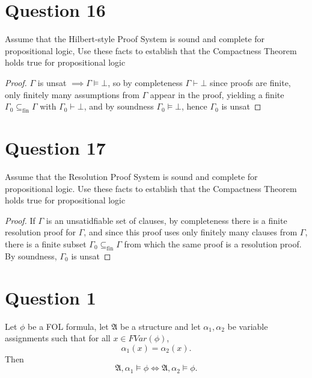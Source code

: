 \documentclass{article}
\newtheorem{lemma}[theorem]{Lemma}
\let\oldlemma\lemma
\let\endoldlemma\endlemma
\renewenvironment{lemma}
  {\begin{tcolorbox}[
      colback=green!8,
      colframe=green!50!black,
      boxrule=0.6pt,
      arc=2pt,
      left=6pt,right=6pt,top=4pt,bottom=4pt
    ]\oldlemma}
  {\endoldlemma\end{tcolorbox}}
\begin{document}
\section*{Question 16}
Assume that the Hilbert-style Proof System is sound and complete for propositional logic, Use these facts to establish that the Compactness Theorem holds true for propositional logic
\begin{proof}
    $\Gamma$ is unsat $\implies\Gamma \models \bot$, so by completeness $\Gamma \vdash \bot$ since proofs are finite, only finitely many assumptions from $\Gamma$ appear in the proof, yielding a finite $\Gamma_0 \subseteq_{\mathrm{fin}} \Gamma$ with $\Gamma_0 \vdash \bot$, 
    and by soundness $\Gamma_0 \models \bot$, hence $\Gamma_0$ is unsat
    \end{proof}
\section*{Question 17}
Assume that the Resolution Proof System is sound and complete for propositional logic. Use these facts to establish that the Compactness Theorem holds true for propositional logic
\begin{proof}
    If $\Gamma$ is an unsatidfiable set of clauses, by completeness there is a finite resolution proof for $\Gamma$, and since this proof uses only finitely many clauses from $\Gamma$, there is a finite subset $\Gamma_0 \subseteq_{\mathrm{fin}} \Gamma$ from which the same proof is a resolution proof. 
    By soundness, $\Gamma_0$ is unsat
    \end{proof}

\newpage

\section*{Question 1}

\begin{lemma}[Relevance Lemma for FOL]
Let $\phi$ be a FOL formula, let $\mathfrak{A}$ be a structure and let $\alpha_1,\alpha_2$ be
variable assignments such that for all $x \in FVar(\phi)$,
\[
\alpha_1(x) = \alpha_2(x).
\]
Then
\[
\mathfrak{A},\alpha_1 \models \phi \iff \mathfrak{A},\alpha_2 \models \phi.
\]
\end{lemma}
\end{document}
